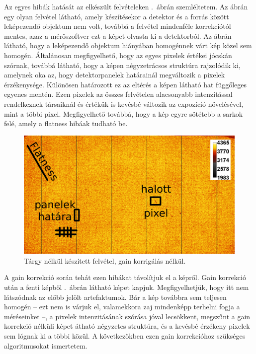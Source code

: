 \documentclass[a4paper,12pt,twoside]{article}
\begin{document}
Az egyes hibák hatását az elkészült felvételeken .~ábrán szemléltetem. Az ábrán egy olyan felvétel látható, amely készítésekor a detektor és a forrás között leképezendő objektum nem volt, továbbá a felvétel mindenféle korrekciótól mentes, azaz a mérőszoftver ezt a képet olvasta ki a detektorból. Az ábrán látható, hogy a leképezendő objektum hiányában homogénnek várt kép közel sem homogén. Általánosan megfigyelhető, hogy az egyes pixelek értékei jócskán szórnak, továbbá látható, hogy a képen négyzetrácsos struktúra rajzolódik ki, amelynek oka  az, hogy detektorpanelek határainál megváltozik a pixelek érzékenysége. Különösen határozott ez az eltérés a képen látható hat függőleges egyenes mentén. Ezen pixelek az összes felvételen alacsonyabb intenzitással rendelkeznek társaiknál és értékük is kevésbé változik az expozíció növelésével, mint a többi pixel. Megfigyelhető továbbá, hogy a kép egyre sötétebb a sarkok felé, amely a flatness hibáak tudható be.

\begin{figure}[htbp]
\center
\includegraphics[width=1.0\textwidth]{abrak/gainnelkul}
\caption{Tárgy nélkül készített felvétel, gain korrigálás nélkül.}
\label{fig:gainnelkul}
\end{figure}

A gain korrekció során tehát ezen hibákat távolítjuk el a képről. Gain korrekció után a fenti képből .~ábrán látható képet kapjuk. Megfigyelhetjük, hogy itt nem látszódnak az előbb jelölt artefaktumok. Bár a kép továbbra sem teljesen homogén -- ezt nem is várjuk el, valamekkora zaj mindenképp terhelni fogja a méréseinket --, a pixelek intenzitásának szórása jóval lecsökkent, megszűnt a gain korrekció nélküli képet átható négyzetes struktúra, és a kevésbé érzékeny pixelek sem lógnak ki a többi közül. A következőkben ezen  gain korrekcióhoz szükséges algoritmusokat ismertetem.
\end{document}

